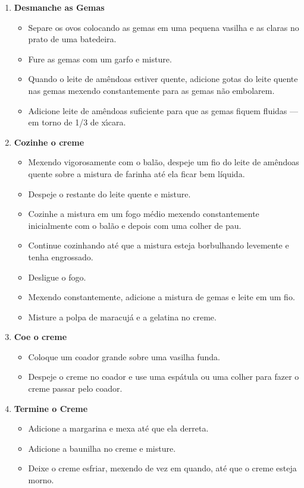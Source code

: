 \documentclass [11pt, letterpaper] {article}
\begin{document}
\begin{description}
\begin{enumerate}
	\item {\bf Desmanche as Gemas}
	\begin{itemize}
	\item Separe os ovos colocando as gemas em uma pequena vasilha e as claras no prato de uma batedeira. 
	\item Fure as gemas com um garfo e misture. 
	\item Quando o leite de am\^endoas estiver quente, adicione gotas do leite quente nas gemas mexendo constantemente para as gemas n\~ao embolarem. 
	\item Adicione leite de am\^endoas suficiente para que as gemas fiquem fluidas --- em torno de 1/3 de x\'{\i}cara.
	\end{itemize}

	\item {\bf Cozinhe o creme}
	\begin{itemize}
	\item Mexendo vigorosamente com o bal\~ao, despeje um fio do leite de am\^endoas quente sobre a mistura de farinha at\'e ela ficar bem l\'iquida.
	\item Despeje o  restante do leite quente e misture.  
	\item Cozinhe a mistura em um fogo m\'edio mexendo constantemente inicialmente com o bal\~ao e depois com uma colher de pau. 
	\item Continue cozinhando at\'e que a mistura esteja borbulhando levemente e tenha engrossado. 
	\item Desligue o fogo. 
	\item Mexendo constantemente, adicione a mistura de gemas e leite em um fio. 
	\item Misture a polpa de maracuj\'a e a gelatina no creme. 
	\end{itemize}
	
	\item {\bf Coe o creme}
	\begin{itemize}
	\item Coloque um coador grande sobre uma vasilha funda. 
	\item Despeje o creme no coador e use uma esp\'atula ou uma colher para fazer o creme passar pelo coador.
	\end{itemize}
	
	\item {\bf Termine o Creme}
	\begin{itemize}
	\item Adicione a margarina e mexa at\'e que ela derreta. 
	\item Adicione a baunilha no creme e misture. 
	\item Deixe o creme esfriar, mexendo de vez em quando, at\'e que o creme esteja morno.
	\end{itemize}


\end{enumerate}
\end{description}
\end{document}
